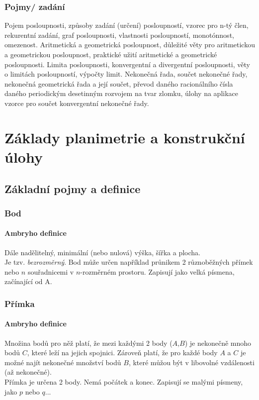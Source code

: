 \documentclass[12pt]{article}
\begin{document}
\subsubsection{Pojmy/ zadání}
Pojem posloupnosti, způsoby zadání (určení) posloupností, vzorec pro n-tý člen, rekurentní zadání, graf posloupnosti, vlastnosti posloupností, monotónnost, omezenost. Aritmetická a geometrická posloupnost, důležité věty pro aritmetickou a geometrickou posloupnost, praktické užití aritmetické a geometrické posloupnosti. Limita posloupnosti, konvergentní a divergentní posloupnosti, věty o limitách posloupností, výpočty limit. Nekonečná řada, součet nekonečné řady, nekonečná geometrická řada a její součet, převod daného racionálního čísla daného periodickým desetinným rozvojem na tvar zlomku, úlohy na aplikace vzorce pro součet konvergentní nekonečné řady.

\section{Základy planimetrie a konstrukční úlohy}
\subsection{Základní pojmy a definice}
\subsubsection{Bod}
\paragraph{Ambryho definice} Dále nadělitelný, minimální (nebo nulová) výška, šířka a plocha.\\
Je tzv. \emph{bezrozměrný}. Bod může určen například průnikem 2 různoběžných přímek nebo $n$ souřadnicemi v $n$-rozměrném prostoru. Zapisují jako velká písmena, začínající od A.
\subsubsection{Přímka}
\paragraph{Ambryho definice} Množina bodů pro něž platí, že mezi každými 2 body ($A$,$B$) je nekonečně mnoho bodů $C$, které leží na jejich spojnici. Zároveň platí, že pro každé body $A$ a $C$ je možné najít nekonečné množství bodů $B$, které můžou být v libovolné vzdálenosti (až nekonečné).\\
Přímka je určena 2 body. Nemá počátek a konec. Zapisují se malými písmeny, jako $p$ nebo $q$...
\end{document}
